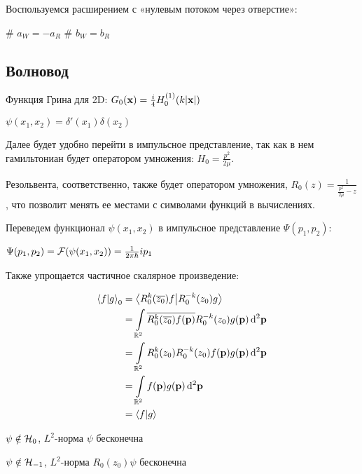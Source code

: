 
Воспользуемся расширением с «нулевым потоком через отверстие»:

\begin{ilist}
# $a_W = -a_R$
# $b_W = b_R$
\end{ilist}

\subsection{Волновод}







Функция Грина для 2D: $G_0(\vb{x}) = \frac{i}{4} H_0^{(1)}(k |\vb{x}|)$




$\psi(x_1, x_2) = \delta'(x_1) \delta(x_2)$

Далее будет удобно перейти в импульсное представление, так как в нем гамильтониан будет оператором умножения: $H_0 = \frac{p^2}{2 \mu}$.

Резольвента, соответственно, также будет оператором умножения, $R_0(z) = \frac{1}{\frac{p^2}{2 \mu} - z}$, что позволит менять ее местами с символами функций в вычислениях.

Переведем функционал $\psi(x_1, x_2)$ в импульсное представление $\Psi(p_1, p_2)$:

$\Psi(p_1, p_2) = \mathcal{F}(\psi(x_1, x_2)) = \frac{1}{2 \pi \hbar} i p_1$

Также упрощается частичное скалярное произведение:

\begin{align*}
\ip{f}{g}_0
&= \ip{R_0^k(\cconj{z_0}) f}{R_0^{-k}(z_0) g} \\
&= \int\limits_{\bbR^2} \cconj{R_0^k(\cconj{z_0}) f(\vb{p})} R_0^{-k}(z_0) g(\vb{p}) \dd[2]{\vb{p}} \\
&= \int\limits_{\bbR^2} R_0^k(z_0) R_0^{-k}(z_0) f(\vb{p}) g(\vb{p}) \dd[2]{\vb{p}} \\
&= \int\limits_{\bbR^2} f(\vb{p}) g(\vb{p}) \dd[2]{\vb{p}} \\
&= \ip{f}{g}
\end{align*}

$\psi \notin \mathcal{H}_{0}$, $L^2$-норма $\psi$ бесконечна

$\psi \notin \mathcal{H}_{-1}$, $L^2$-норма $R_0(z_0) \psi$ бесконечна

